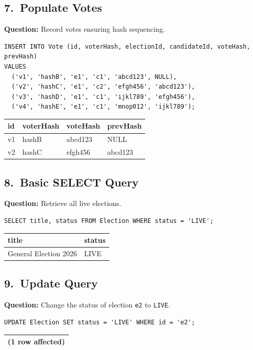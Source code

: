 \documentclass[12pt, a4paper]{article}
\begin{document}
\subsection{7.\ Populate Votes}
\textbf{Question:} Record votes ensuring hash sequencing.
\begin{lstlisting}
INSERT INTO Vote (id, voterHash, electionId, candidateId, voteHash, prevHash)
VALUES
  ('v1', 'hashB', 'e1', 'c1', 'abcd123', NULL),
  ('v2', 'hashC', 'e1', 'c2', 'efgh456', 'abcd123'),
  ('v3', 'hashD', 'e1', 'c1', 'ijkl789', 'efgh456'),
  ('v4', 'hashE', 'e1', 'c1', 'mnop012', 'ijkl789');
\end{lstlisting}

\begin{center}
\begin{tabular}{|>{\ttfamily}l|>{\ttfamily}l|>{\ttfamily}l|>{\ttfamily}l|}
\hline
\textbf{id} & \textbf{voterHash} & \textbf{voteHash} & \textbf{prevHash} \\
\hline
v1 & hashB & abcd123 & NULL     \\
v2 & hashC & efgh456 & abcd123  \\
\hline
\end{tabular}
\end{center}

\subsection{8.\ Basic SELECT Query}
\textbf{Question:} Retrieve all live elections.
\begin{lstlisting}
SELECT title, status FROM Election WHERE status = 'LIVE';
\end{lstlisting}
\begin{center}
\begin{tabular}{|l|l|}
\hline
\textbf{title} & \textbf{status} \\ \hline
General Election 2026 & LIVE \\ \hline
\end{tabular}
\end{center}

\subsection{9.\ Update Query}
\textbf{Question:} Change the status of election \texttt{e2} to \texttt{LIVE}.
\begin{lstlisting}
UPDATE Election SET status = 'LIVE' WHERE id = 'e2';
\end{lstlisting}
\begin{center}
\begin{tabular}{|l|}
\hline
(1 row affected) \\ \hline
\end{tabular}
\end{center}
\end{document}
